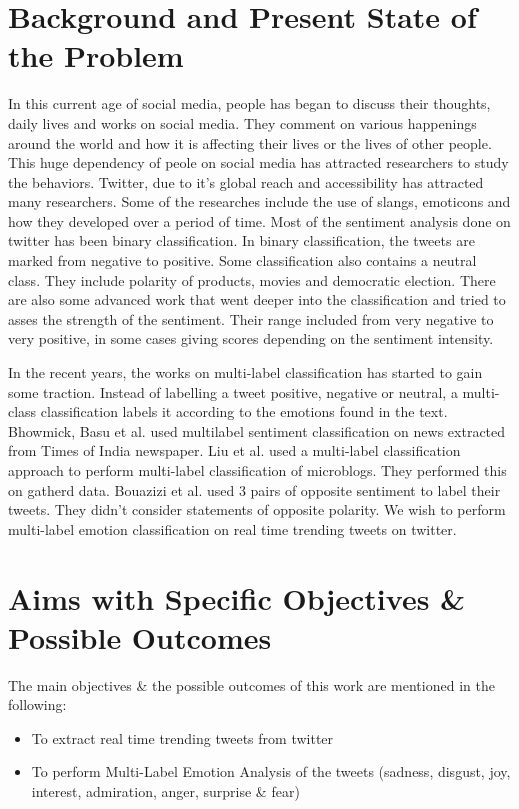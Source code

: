 \documentclass[12pt,a4paper]{article}
\begin{document}
\section{Background and Present State of the Problem}
\par \noindent In this current age of social media, people has began to discuss their thoughts, daily lives and works on social media. They comment on various happenings around the world and how it is affecting their lives or the lives of other people. This huge dependency of peole on social media has attracted researchers to study the behaviors. Twitter, due to it's global reach and accessibility has attracted many researchers. Some of the researches include the use of slangs, emoticons and how they developed over a period of time.\cite{1,2} Most of the sentiment analysis done on twitter has been binary classification. In binary classification, the tweets are marked from negative to positive. Some classification also contains a neutral class. They include polarity of products\cite{3}, movies\cite{4} and democratic election.\cite{5} There are also some advanced work that went deeper into the classification and tried to asses the strength of the sentiment. Their range included from very negative to very positive, in some cases giving scores depending on the sentiment intensity.\cite{6,7} 
\par \noindent In the recent years, the works on multi-label classification has started to gain some traction. Instead of labelling a tweet positive, negative or neutral, a multi-class classification labels it according to the emotions found in the text. Bhowmick, Basu et al.\cite{8} used multilabel sentiment classification on news extracted from Times of India newspaper. Liu et al.\cite{9} used a multi-label classification approach to perform multi-label classification of microblogs. They performed this on gatherd data. Bouazizi et al.\cite{10} used 3 pairs of opposite sentiment to label their tweets. They didn't consider statements of opposite polarity. We wish to perform multi-label emotion classification on real time trending tweets on twitter.

\section{Aims with Specific Objectives \& Possible Outcomes}
\par \noindent The main objectives \& the possible outcomes of this work are mentioned in the following:
\begin{itemize}
\item To extract real time trending tweets from twitter
\item To perform Multi-Label Emotion Analysis of the tweets (sadness, disgust, joy, interest, admiration, anger, surprise \& fear)
\end{itemize}
\end{document}
